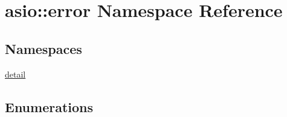 \hypertarget{namespaceasio_1_1error}{}\section{asio\+:\+:error Namespace Reference}
\label{namespaceasio_1_1error}
\subsection*{Namespaces}
\begin{DoxyCompactItemize}
\item 
 \hyperlink{namespaceasio_1_1error_1_1detail}{detail}
\end{DoxyCompactItemize}
\subsection*{Enumerations}
